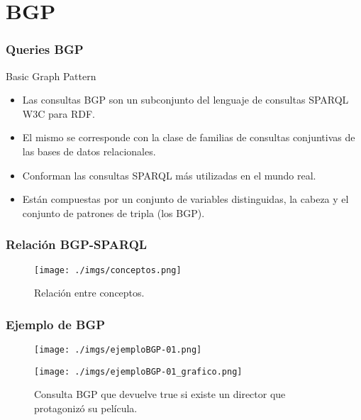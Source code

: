 \documentclass{beamer}
\begin{document}
\section{BGP}
\begin{frame}
\frametitle{Queries BGP}
\begin{exampleblock}{Basic Graph Pattern}
\begin{itemize}
\item<1-> Las consultas BGP son un subconjunto del lenguaje de consultas SPARQL W3C para RDF. 
\item<2-> El mismo se corresponde con la clase de familias de consultas conjuntivas de las bases de datos relacionales. 
\item<3-> Conforman las consultas SPARQL más utilizadas en el mundo real.
\item<4-> Están compuestas por un conjunto de variables distinguidas, la cabeza y el conjunto de patrones de tripla (los BGP).
\end{itemize}
\end{exampleblock}
\end{frame}

\begin{frame}
\frametitle{Relación BGP-SPARQL}
\begin{figure}[H] %
\begin{center}
\texttt{[image: ./imgs/conceptos.png]}
\caption{Relación entre conceptos.}
\end{center}
\end{figure}
\end{frame}
\begin{frame}
\frametitle{Ejemplo de BGP}
\begin{figure}[ht]
\centering
\begin{minipage}[b]{0.45\linewidth}
\texttt{[image: ./imgs/ejemploBGP-01.png]}
\label{fig:minipage1}
\end{minipage}
\quad
\begin{minipage}[b]{0.45\linewidth}
\texttt{[image: ./imgs/ejemploBGP-01\_grafico.png]}
\label{fig:minipage2}
\end{minipage}

Consulta BGP que devuelve true si existe un director que protagonizó su película.
\end{figure}
\end{frame}
\end{document}
